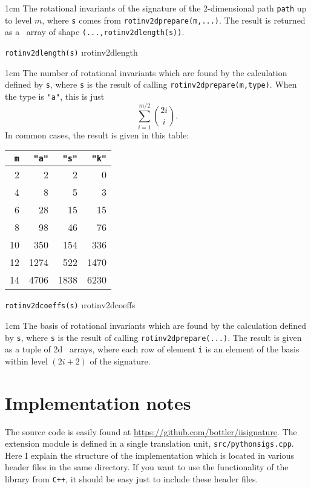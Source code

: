 \documentclass[a4paper]{extarticle}
\newenvironment{defn}{\begin{adjustwidth}{1cm}{}\ignorespaces}{\end{adjustwidth}\ignorespacesafterend}
\begin{document}
\begin{defn}
	\nopagebreak The rotational invariants of the signature of the 2-dimensional path \verb|path| up to level $m$, where \verb!s! comes from \verb!rotinv2dprepare(m,...)!. The result is returned as a \numpy\ array of shape \verb!(...,rotinv2dlength(s))!.
\end{defn}
\verb!rotinv2dlength(s)! \i{rotinv2dlength}

\begin{defn}
	\nopagebreak The number of rotational invariants which are found by the calculation defined by \verb!s!, where \verb!s! is the result of calling \verb!rotinv2dprepare(m,type)!. When the type is \verb|"a"|, this is just \[\sum_{i=1}^{m/2}\binom{2i}{i}.\] 
	In common cases, the result is given in this table:
\end{defn}


\begin{center}
\begin{tabular}{r|rrr}
\verb|m|&\verb|"a"|&\verb|"s"|&\verb|"k"|\\\hline
2&2&2&0\\
4&8&5&3\\
6&28&15&15\\
8&98&46&76\\
10&350&154&336\\
12&1274&522&1470\\
14&4706&1838&6230\\%
\end{tabular}
\end{center}

\verb!rotinv2dcoeffs(s)! \i{rotinv2dcoeffs}

\begin{defn}
	\nopagebreak The basis of rotational invariants which are found by the calculation defined by \verb!s!, where \verb!s! is the result of calling \verb!rotinv2dprepare(...)!. The result is given as a tuple of 2d \numpy\ arrays, where each row of element \verb|i| is an element of the basis within level $(2i+2)$ of the signature.
	\end{defn}

\section{Implementation notes}
The source code is easily found at \url{https://github.com/bottler/iisignature}. The extension module is defined in a single translation unit, \verb|src/pythonsigs.cpp|. Here I explain the structure of the implementation which is located in various header files in the same directory. If you want to use the functionality of the library from \verb!C++!, it should be easy just to include these header files.
\end{document}
